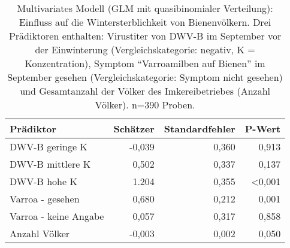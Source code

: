 \begin{table}[htb]
    \caption{Multivariates Modell (GLM mit quasibinomialer Verteilung): Einfluss auf die Wintersterblichkeit von Bienenvölkern. Drei Prädiktoren enthalten: Virustiter von DWV-B im September vor der Einwinterung (Vergleichskategorie: negativ, K = Konzentration), Symptom \enquote{Varroamilben auf Bienen} im September gesehen (Vergleichskategorie: Symptom nicht gesehen) und Gesamtanzahl der Völker des Imkereibetriebes (Anzahl Völker). n=390 Proben.}
    \centering
    \label{tab:m:regression}
    \begin{tabular}{l|rrr}
        \toprule
        Prädiktor & Schätzer & Standardfehler & P-Wert \\
        \midrule
        DWV-B geringe K     & -0,039  & 0,360    & 0,913  \\ 
        DWV-B mittlere K    & 0,502   & 0,337    & 0,137\\ 
        DWV-B hohe K        & 1.204   & 0,355    & <0,001\\ 
        \midrule
        Varroa - gesehen        & 0,680 & 0,212 & 0,001 \\
        Varroa - keine Angabe   & 0,057 & 0,317 & 0,858 \\
        \midrule
        Anzahl Völker           & -0,003    & 0,002     & 0,050 \\
        \bottomrule
    \end{tabular}

\end{table}